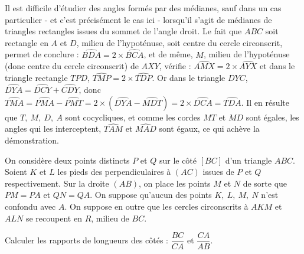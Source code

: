 \begin{center}

\end{center}

\begin{sol}

\medskip

Il est difficile d'étudier des angles formés par des médianes, sauf dans un cas particulier - et c'est précisément le cas ici - lorsqu'il s'agit de médianes de triangles rectangles issues du sommet de l'angle droit. Le fait que $ABC$ soit rectangle en $A$ et $D$, milieu de l'hypoténuse, soit centre du cercle circonscrit, permet de conclure : $\widehat{BDA} = 2 \times \widehat{BCA}$, et de même, $M$, milieu de l'hypoténuse (donc centre du cercle circonscrit) de $AXY$, vérifie : $\widehat{AMX} = 2 \times \widehat{AYX}$ et dans le triangle rectangle $TPD$, $\widehat{TMP} = 2 \times \widehat{TDP}$. Or dans le triangle $DYC$, $\widehat{DYA} = \widehat{DCY} + \widehat{CDY}$, donc $\widehat{TMA} = \widehat{PMA} - \widehat{PMT} = 2 \times \left( \widehat{DYA} - \widehat{MDT} \right) = 2 \times \widehat{DCA} = \widehat{TDA}$. Il en résulte que $T, \ M, \ D, \ A$ sont cocycliques, et comme les cordes $MT$ et $MD$ sont égales, les angles qui les interceptent, $\widehat{TAM}$ et $\widehat{MAD}$ sont égaux, ce qui achève la démonstration.

\end{sol}

\bigskip


\begin{exo}

\medskip

On considère deux points distincts $P$ et $Q$ sur le côté $[BC]$ d'un triangle $ABC$. Soient $K$ et $L$ les pieds des perpendiculaires à $(AC)$ issues de $P$ et $Q$ respectivement. Sur la droite $(AB)$, on place les points $M$ et $N$ de sorte que $PM = PA$ et $QN = QA$. On suppose qu'aucun des points $K, \ L, \ M, \ N$ n'est confondu avec $A$. On suppose en outre que les cercles circonscrits à $AKM$ et $ALN$ se recoupent en $R$, milieu de $BC$. 

Calculer les rapports de longueurs des côtés : $\dfrac{BC}{CA}$  et  $\dfrac{CA}{AB}$. 

\end{exo}

